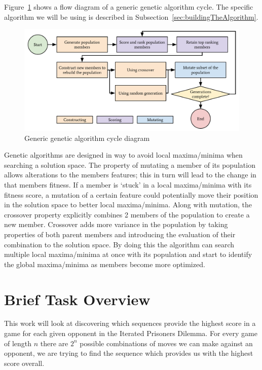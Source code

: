 Figure~\ref{fig:genericGACycle} shows a flow diagram of a generic genetic algorithm cycle.
The specific algorithm we will be using is described in Subsection~\ref{sec:buildingTheAlgorithm}.

\begin{figure}[ht]
    \centering
    \includegraphics[width=1.0\textwidth, center]{./img/flows/ga_cycle.pdf}
    \caption{Generic genetic algorithm cycle diagram}\label{fig:genericGACycle} 
\end{figure}

Genetic algorithms are designed in way to avoid local maxima/minima when searching a solution space.
The property of mutating a member of its population allows alterations to the members features; 
this in turn will lead to the change in that members fitness.
If a member is `stuck' in a local maxima/minima with its fitness score, a mutation of a certain feature could potentially move their position in the solution space to better local maxima/minima.
Along with mutation, the crossover property explicitly combines 2 members of the population to create a new member. 
Crossover adds more variance in the population by taking properties of both parent members and introducing the evaluation of their combination to the solution space.
By doing this the algorithm can search multiple local maxima/minima at once with its population and start to identify the global maxima/minima as members become more optimized.

\section{Brief Task Overview}\label{sec:briefOverview}
This work will look at discovering which sequences provide the highest score in a game for each given opponent in the Iterated Prisoners Dilemma.
For every game of length $n$ there are $2^n$ possible combinations of moves we can make against an opponent, we are trying to find the sequence which provides us with the highest score overall.

